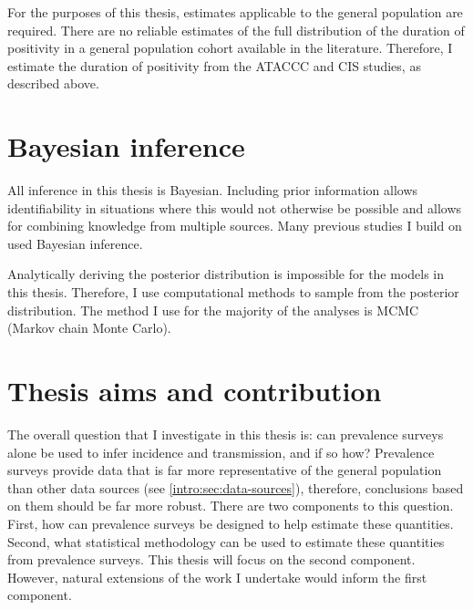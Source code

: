 \documentclass[thesis.tex]{subfiles}
\begin{document}
For the purposes of this thesis, estimates applicable to the general population are required.
There are no reliable estimates of the full distribution of the duration of positivity in a general population cohort available in the literature.
Therefore, I estimate the duration of positivity from the ATACCC and CIS studies, as described above.

\section{Bayesian inference} \label{intro:sec:Bayes}

All inference in this thesis is Bayesian.
Including prior information allows identifiability in situations where this would not otherwise be possible and allows for combining knowledge from multiple sources.
Many previous studies I build on used Bayesian inference.

Analytically deriving the posterior distribution is impossible for the models in this thesis.
Therefore, I use computational methods to sample from the posterior distribution.
The method I use for the majority of the analyses is MCMC (Markov chain Monte Carlo).

\section{Thesis aims and contribution} \label{intro:sec:aims}

The overall question that I investigate in this thesis is: can prevalence surveys alone be used to infer incidence and transmission, and if so how?
Prevalence surveys provide data that is far more representative of the general population than other data sources (see \cref{intro:sec:data-sources}), therefore, conclusions based on them should be far more robust.
There are two components to this question.
First, how can prevalence surveys be designed to help estimate these quantities.
Second, what statistical methodology can be used to estimate these quantities from prevalence surveys.
This thesis will focus on the second component.
However, natural extensions of the work I undertake would inform the first component.
\end{document}
